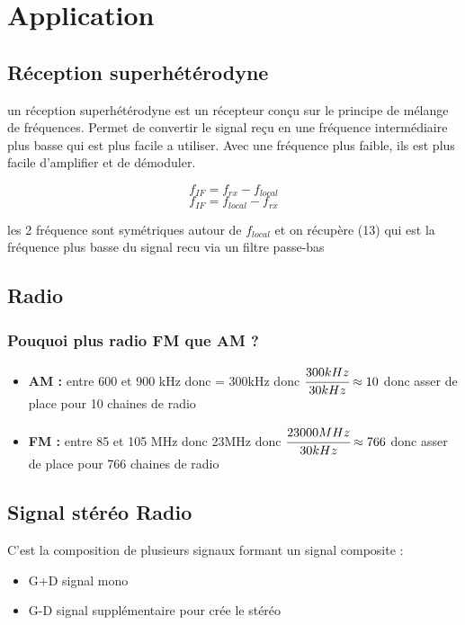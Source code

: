 \documentclass[12pt]{article}
\begin{document}
\section{Application}
	\subsection{Réception superhétérodyne}
		un réception superhétérodyne est un récepteur conçu sur le principe de mélange de fréquences. Permet de convertir le signal reçu en une fréquence intermédiaire plus basse qui est plus facile a utiliser. Avec une fréquence plus faible, ils est plus facile d'amplifier et de démoduler.
	
		\begin{equation}
			 f_{IF} = f_{rx}-f_{local}
		\end{equation}
		\begin{equation}
			 f_{IF} = f_{local}-f_{rx}
		\end{equation}
		
		les 2 fréquence sont symétriques autour de $f_{local}$ et on récupère (13) qui est la fréquence plus basse du signal recu via un filtre passe-bas
		
	\subsection{Radio}
		\subsubsection{Pouquoi plus radio FM que AM ?}
			\begin{itemize}
				\item \textbf{AM :} entre 600 et 900 kHz donc = 300kHz donc $\cfrac{300kHz}{30kHz} \approx 10$ donc asser de place pour 10 chaines de radio
				\item \textbf{FM :} entre 85 et 105 MHz donc 23MHz donc $\cfrac{23 000 MHz}{30kHz} \approx 766$ donc asser de place pour 766 chaines de radio
			\end{itemize}
			
		\subsection{Signal stéréo Radio}
			C'est la composition de plusieurs signaux formant un signal composite :
			\begin{itemize}
				\item G+D signal mono
				\item G-D signal supplémentaire pour crée le stéréo
			\end{itemize}
		
\end{document}
